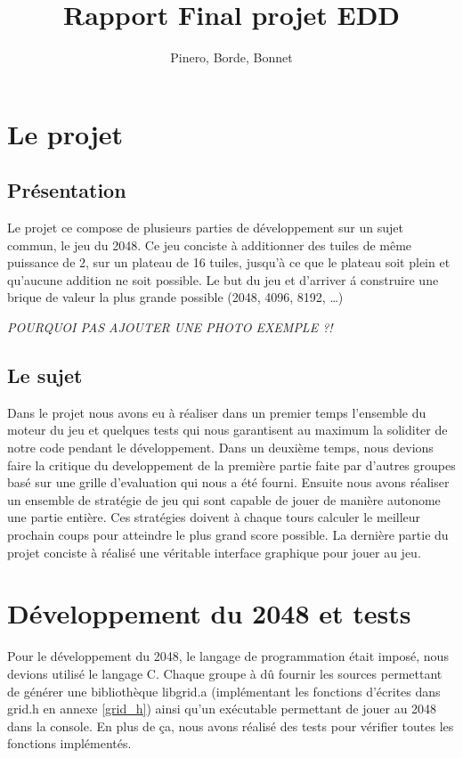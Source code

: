 \documentclass[12pt]{article}
\title{Rapport Final projet EDD}
\author{Pinero, Borde, Bonnet}
\begin{document}
\maketitle
\tableofcontents

\newpage

\section{Le projet}
\subsection{Pr\'esentation}
Le projet ce compose de plusieurs parties de d\'eveloppement sur un sujet
commun, le jeu du 2048. Ce jeu conciste \`a additionner des tuiles de m\^eme
puissance de 2, sur un plateau de 16 tuiles, jusqu'\`a ce que le plateau soit
plein et qu'aucune addition ne soit possible. Le but du jeu et d’arriver \'a
construire une brique de valeur la plus grande possible (2048, 4096,
8192, \ldots)
\par 
\emph{\color{red}POURQUOI PAS AJOUTER UNE PHOTO EXEMPLE ?!}
\subsection{Le sujet}
Dans le projet nous avons eu \`a r\'ealiser dans un premier temps l'ensemble du
moteur du jeu et quelques tests qui nous garantisent au maximum la soliditer de notre code 
pendant le d\'eveloppement. Dans un deuxi\`eme temps, nous devions faire la
\og critique \fg{} du developpement de la premi\`ere partie faite par
d'autres groupes bas\'e sur une grille d'evaluation qui nous a \'et\'e
fourni. Ensuite nous avons r\'ealiser un ensemble de strat\'egie de jeu qui
sont capable de jouer de mani\`ere autonome une partie enti\`ere. Ces strat\'egies doivent \`a chaque tours calculer le meilleur
prochain coups pour atteindre le plus grand score possible. La derni\`ere partie
du projet conciste \`a r\'ealis\'e une v\'eritable interface graphique pour
jouer au jeu.

\newpage
\section{D\'eveloppement du 2048 et tests}
Pour le d\'eveloppement du 2048, le langage de programmation \'etait impos\'e,
nous devions utilis\'e le langage C. Chaque groupe à d\^u fournir les sources
permettant de g\'en\'erer une biblioth\`eque libgrid.a (impl\'ementant les
fonctions d'\'ecrites dans grid.h en annexe \ref{grid_h}) ainsi qu’un
ex\'ecutable permettant de jouer au 2048 dans la console. En plus de ça, nous
avons r\'ealis\'e des tests pour v\'erifier toutes les fonctions
impl\'ement\'es.\par
\end{document}
